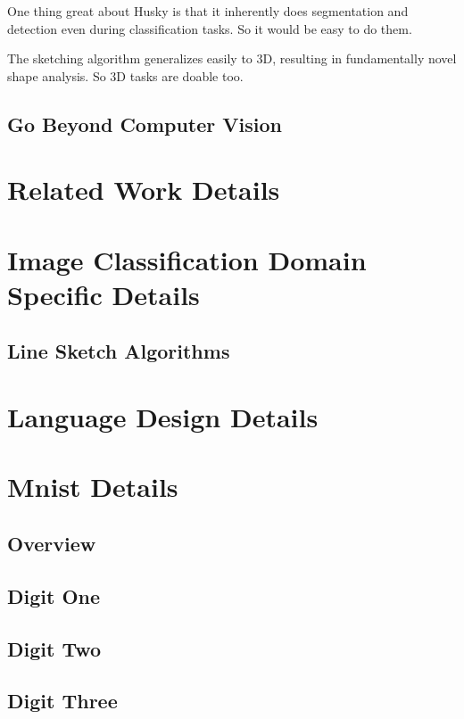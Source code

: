\documentclass[11pt]{article} 	%
\theoremstyle{definition}
\begin{document}
One thing great about Husky is that it inherently does segmentation and detection even during classification tasks. So it would be easy to do them.

The sketching algorithm generalizes easily to 3D, resulting in fundamentally novel shape analysis. So 3D tasks are doable too.

\subsection{Go Beyond Computer Vision}

\appendix

\section{Related Work Details}

\section{Image Classification Domain Specific Details}

\subsection{Line Sketch Algorithms}


\section{Language Design Details}

\section{Mnist Details}

\subsection{Overview}


\subsection{Digit One}

\subsection{Digit Two}

\subsection{Digit Three}
\end{document}
